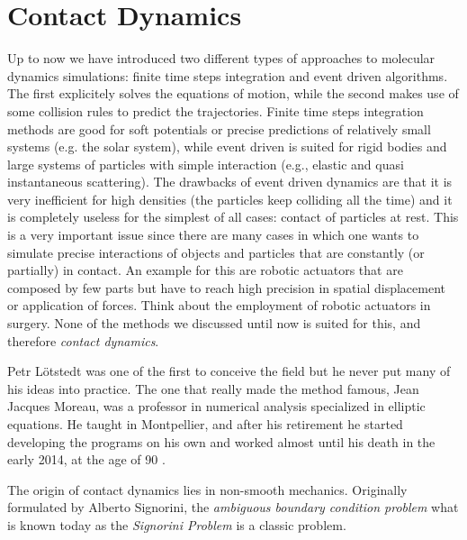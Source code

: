 

\section{Contact Dynamics}


Up to now we have introduced two different types of approaches to molecular dynamics simulations: finite time steps integration and event driven algorithms. The first explicitely solves the equations of motion, while the second makes  use of some collision rules to predict the trajectories. Finite time steps integration methods are good for soft potentials or precise predictions of relatively small systems (e.g. the solar system), while event driven is suited for rigid bodies and large systems of particles with simple interaction (e.g., elastic and quasi instantaneous scattering). The drawbacks of event driven dynamics are that it is very inefficient for high densities (the particles keep colliding all the time) and it is completely useless for the simplest of all cases: contact of particles at rest. This is a very important issue since there are many cases in which one wants to simulate precise interactions of objects and particles that are constantly (or partially) in contact. An example for this are robotic actuators that are composed by few parts but have to reach high precision in spatial displacement or application of forces. Think about the employment of robotic actuators in surgery. None of the methods we discussed until now is suited for this, and therefore \emph{contact dynamics}.



Petr L\"otstedt was one of the first to conceive the field but he never put many of his ideas into practice. The one that really made the method famous, Jean Jacques Moreau, was a professor in numerical analysis specialized in elliptic equations. He taught in Montpellier, and after his retirement he started developing the programs on his own and worked almost until his death in the early 2014, at the age of 90  \citep{moreau_comm}. 


\vspace{.5cm}
The origin of contact dynamics lies in non-smooth mechanics. Originally formulated by Alberto Signorini, the \emph{ambiguous boundary condition problem} what is known today as the \emph{Signorini Problem} is a classic problem.  


